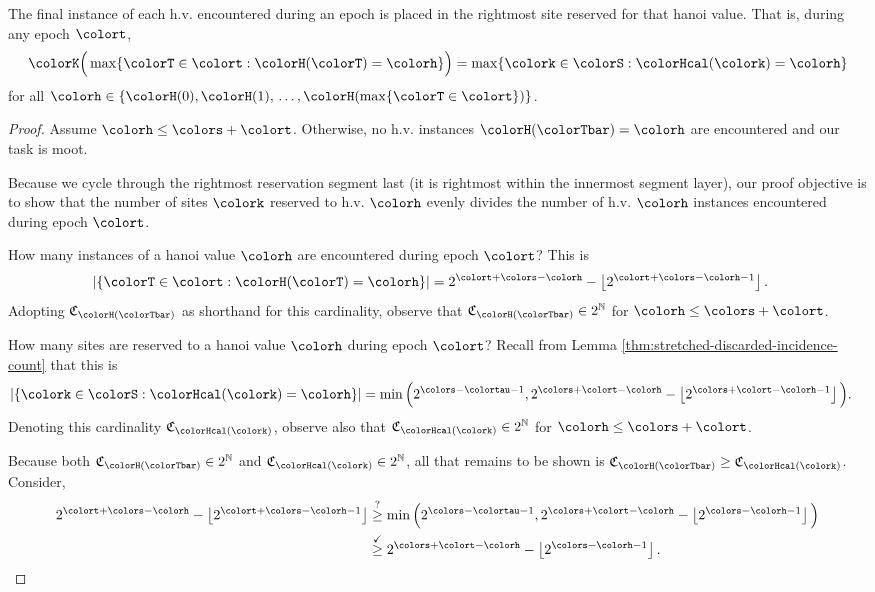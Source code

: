\begin{lemma}
\label{lemma:tilted-last-touched}
The final instance of each h.v. encountered during an epoch is placed in the rightmost site reserved for that hanoi value.
That is, during any epoch $\colort$,
\begin{align*}
\colorK\Big(
  \max\{\colorT \in \colort : \colorH(\colorT) = \colorh\}
\Big)
=
\max\{\colork \in \colorS : \colorHcal(\colork) = \colorh \}
\end{align*}
for all $\colorh \in \{\colorH(0), \colorH(1), \,\ldots, \colorH(\max\{\colorT \in \colort\})\}$.
\end{lemma}

\begin{proof}
Assume $\colorh \leq \colors + \colort$.
Otherwise, no h.v. instances $\colorH(\colorTbar) = \colorh$ are encountered and our task is moot.

Because we cycle through the rightmost reservation segment last (it is rightmost within the innermost segment layer), our proof objective is to show that the number of sites $\colork$ reserved to h.v. $\colorh$ evenly divides the number of h.v. $\colorh$ instances encountered during epoch $\colort$.

How many instances of a hanoi value $\colorh$ are encountered during epoch $\colort$?
This is
\begin{align*}
|\{\colorT \in \colort : \colorH(\colorT) = \colorh\}|
&=
2^{\colort + \colors - \colorh} - \left\lfloor2^{\colort + \colors - \colorh - 1} \right\rfloor.
\end{align*}
Adopting $\mathfrak{C}_{\colorH(\colorTbar)}$ as shorthand for this cardinality, observe that $\mathfrak{C}_{\colorH(\colorTbar)} \in 2^{\mathbb{N}}$ for $\colorh \leq \colors + \colort$.

How many sites are reserved to a hanoi value $\colorh$ during epoch $\colort$?
Recall from Lemma \ref{thm:stretched-discarded-incidence-count} that this is
\begin{align*}
|\{\colork \in \colorS : \colorHcal(\colork) = \colorh\}|
&=
\min\Big(
2^{\colors - \colortau - 1},
2^{\colors + \colort - \colorh} - \left\lfloor 2^{\colors + \colort - \colorh - 1} \right\rfloor
\Big).
\end{align*}
Denoting this cardinality $\mathfrak{C}_{\colorHcal(\colork)}$, observe also that
$\mathfrak{C}_{\colorHcal(\colork)} \in 2^{\mathbb{N}}$ for $\colorh \leq \colors + \colort$.

Because both $\mathfrak{C}_{\colorH(\colorTbar)} \in 2^{\mathbb{N}}$ and $\mathfrak{C}_{\colorHcal(\colork)} \in 2^{\mathbb{N}}$, all that remains to be shown is $\mathfrak{C}_{\colorH(\colorTbar)} \geq \mathfrak{C}_{\colorHcal(\colork)}$.
Consider,
\begin{align*}
2^{\colort + \colors - \colorh} - \left\lfloor2^{\colort + \colors - \colorh - 1} \right\rfloor
&\stackrel{?}{\geq}
\min\Big(
2^{\colors - \colortau - 1},
2^{\colors + \colort - \colorh} - \left\lfloor 2^{\colors - \colorh - 1} \right\rfloor
\Big)\\
&\stackrel{\checkmark}{\geq}
2^{\colors + \colort - \colorh} - \left\lfloor 2^{\colors - \colorh - 1} \right\rfloor.
\end{align*}
\end{proof}
